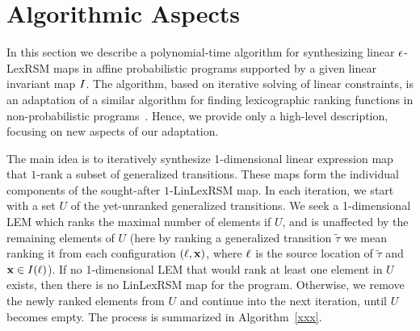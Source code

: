 \section{Algorithmic Aspects}

In this section we describe a polynomial-time algorithm for synthesizing linear $\epsilon$-LexRSM maps in affine probabilistic programs supported by a given linear invariant map $I$. The algorithm, based on iterative solving of linear constraints, is an adaptation of a similar algorithm for finding lexicographic ranking functions in non-probabilistic programs~\cite{xxx}. Hence, we provide only a high-level description, focusing on new aspects of our adaptation. 

The main idea is to iteratively synthesize 1-dimensional linear expression map that $1$-rank a subset of generalized transitions. These maps form the individual components of the sought-after $1$-LinLexRSM map. In each iteration, we start with a set $U$ of the yet-unranked generalized transitions. We seek a 1-dimensional LEM which ranks the maximal number of elements if $U$, and is unaffected by the remaining elements of $U$ (here by ranking a generalized transition $\tilde\tau$ we mean ranking it from each configuration $(\ell,\mathbf{x})$, where $\ell$ is the source location of $\tilde\tau$ and $\mathbf{x}\in I(\ell)$). If no 1-dimensional LEM that would rank at least one element in $U$ exists, then there is no LinLexRSM map for the program. Otherwise, we remove the newly ranked elements from $U$ and continue into the next iteration, until $U$ becomes empty. The process is summarized in Algorithm~\ref{xxx}.

